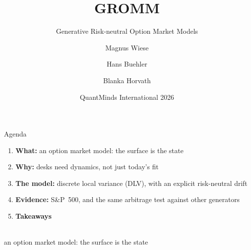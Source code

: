 \documentclass[aspectratio=169,11pt,handout]{beamer}
\title{GROMM}
\subtitle{Generative Risk-neutral Option Market Models}
\author{Magnus Wiese \and Hans Buehler \and Blanka Horvath}
\institute{Mathematical Institute, University of Oxford}
\date{QuantMinds International 2026}
\newcommand{\divider}[2]{\begin{frame}\vspace*{0.35\textheight}{\Huge #1}\\[0.6em]{\large\color{gray}#2}\end{frame}}
\begin{document}
\maketitle

\begin{frame}{Agenda}
\begin{enumerate}
\setlength{\itemsep}{0.8em}
\item \textbf{What:} an option market model: the surface is the state
\item \textbf{Why:} desks need dynamics, not just today's fit
\item \textbf{The model:} discrete local variance (DLV), with an explicit risk-neutral drift
\item \textbf{Evidence:} S\&P~500, and the same arbitrage test against other generators
\item \textbf{Takeaways}
\end{enumerate}
\end{frame}

\divider{What}{an option market model: the surface is the state}
\end{document}
